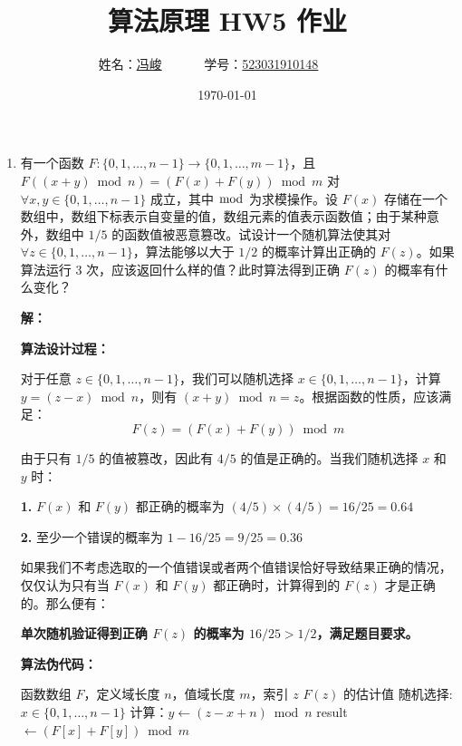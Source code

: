 \documentclass[UTF8,12pt,a4paper]{ctexart}
\title{算法原理 HW5 作业}
\author{
	姓名：\underline{冯峻}~~~~~~
	学号：\underline{523031910148}~~~~~~}
\date{\today}
\begin{document}
\fancyfoot[C]{\thepage}

\maketitle

\begin{enumerate}[1.]
	\item 有一个函数 $F:\{0,1,\ldots,n-1\} \to \{0,1,\ldots,m-1\}$，且 $F((x+y)\bmod n) = (F(x) + F(y))\bmod m$ 对 $\forall x, y \in \{0,1,\ldots,n-1\}$ 成立，其中 $\bmod$ 为求模操作。设 $F(x)$ 存储在一个数组中，数组下标表示自变量的值，数组元素的值表示函数值；由于某种意外，数组中 $1/5$ 的函数值被恶意篡改。试设计一个随机算法使其对 $\forall z \in \{0,1,\ldots,n-1\}$，算法能够以大于 $1/2$ 的概率计算出正确的 $F(z)$。如果算法运行 3 次，应该返回什么样的值？此时算法得到正确 $F(z)$ 的概率有什么变化？

	\textbf{解：}
	
	\textbf{算法设计过程：}

	对于任意 $z \in \{0,1,\ldots,n-1\}$，我们可以随机选择 $x \in \{0,1,\ldots,n-1\}$，计算 $y = (z-x) \bmod n$，则有 $(x+y) \bmod n = z$。根据函数的性质，应该满足：
	$$F(z) = (F(x) + F(y)) \bmod m$$

	由于只有 $1/5$ 的值被篡改，因此有 $4/5$ 的值是正确的。当我们随机选择 $x$ 和 $y$ 时：
	
	\textbf{1.} $F(x)$ 和 $F(y)$ 都正确的概率为 $(4/5) \times (4/5) = 16/25 = 0.64$
	
	\textbf{2.} 至少一个错误的概率为 $1 - 16/25 = 9/25 = 0.36$
	
	如果我们不考虑选取的一个值错误或者两个值错误恰好导致结果正确的情况，仅仅认为只有当 $F(x)$ 和 $F(y)$ 都正确时，计算得到的 $F(z)$ 才是正确的。那么便有：

	\textbf{单次随机验证得到正确 $F(z)$ 的概率为 $16/25 > 1/2$，满足题目要求。}

	\textbf{算法伪代码：}
	\begin{algorithm}[H]
		\caption{COMPUTE-F($F, n, m, z$)}
		\begin{algorithmic}[1]
			\Require 函数数组 $F$，定义域长度 $n$，值域长度 $m$，索引 $z$
			\Ensure $F(z)$ 的估计值
			\State 随机选择: $x \in \{0,1,\ldots,n-1\}$
			\State 计算：$y \gets (z - x + n) \bmod n$
			\State result $\gets (F[x] + F[y]) \bmod m$
			\State {}
		\end{algorithmic}
	\end{algorithm}


\end{enumerate}
\end{document}
